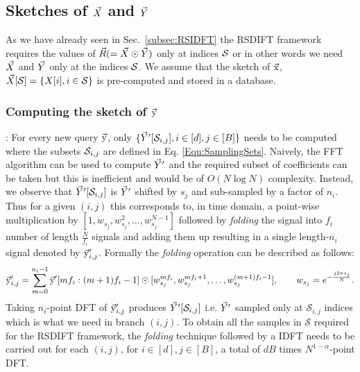 \subsection{Sketches of $\vec{X}$ and $\vec{Y}$} 
\label{subsec:skteches}		 
 As we have already seen in Sec.~\ref{subsec:RSIDFT} the RSDIFT framework requires the values of $\vec{R}(=\vec{X}\odot \vec{Y})$ only at indices $\mathcal{S}$ or in other words we need $\vec{X}$ and $\vec{Y}$ only at the indices $\mathcal{S}$. We assume that the sketch of $\vec{\mathrm{x}}$, $ \vec{X}[\mathcal{S}]= \{X[i],i\in \mathcal{S}\}$ is pre-computed and stored in a database.

\subsubsection*{Computing the sketch of $\vec{\mathrm{y}}$}: For every new query $\vec{\mathrm{y}}$, only $\{\vec{Y}'[\mathcal{S}_{i,j}],i\in[d],j\in[B]\}$ needs to be computed where the subsets $\mathcal{S}_{i,j}$ are defined in Eq. \eqref{Eqn:SamplingSets}. Naively, the FFT algorithm can be used to compute $\vec{Y}'$ and the required subset of coefficients can be taken but this is inefficient and would be of $O(N \log N)$ complexity. Instead, we observe that $\vec{Y}'[\mathcal{S}_{i,j}]$ is $\vec{Y}'$ shifted by $s_j$ and sub-sampled by a factor of $n_i$. Thus for a given $(i,j)$ this corresponds to, in time domain, a point-wise multiplication by $[1,w_{s_j},w_{s_j}^2,\ldots,w_{s_j}^{N-1}]$ followed by \textit{folding} the signal into $f_i$ number of length $\frac{N}{f_i}$ signals and adding them up resulting in a single length-$n_i$ signal denoted by $\vec{\mathrm{y}}'_{i,j}$. Formally the \textit{folding} operation can be described as follows:
	  \begin{equation}
	  	\vec{\mathrm{y}}'_{i,j} = \sum \limits_{m = 0}^{n_i-1} \vec{\mathrm{y}}'[mf_i:(m+1)f_i-1] \odot [w_{s_j}^{mf_i},w_{s_j}^{mf_i+1},\ldots, w_{s_j}^{(m+1)f_i-1}],\qquad w_{s_j}=e^{-\frac{j2\pi s_j}{N}}.
	  \end{equation}
 Taking $n_i$-point DFT of $\vec{\mathrm{y}}'_{i,j}$ produces $\vec{Y}'[\mathcal{S}_{i,j}]$ i.e. $\vec{Y}'$ sampled only at $\mathcal{S}_{i,j}$ indices which is what we need in branch $(i,j)$. To obtain all the samples in $\mathcal{S}$ required for the RSDIFT framework, the \textit{folding} technique followed by a IDFT needs to be carried out for each $(i,j)$, for $i\in[d],j\in[B]$, a total of $dB$ times $N^{1-\alpha}$-point DFT.
